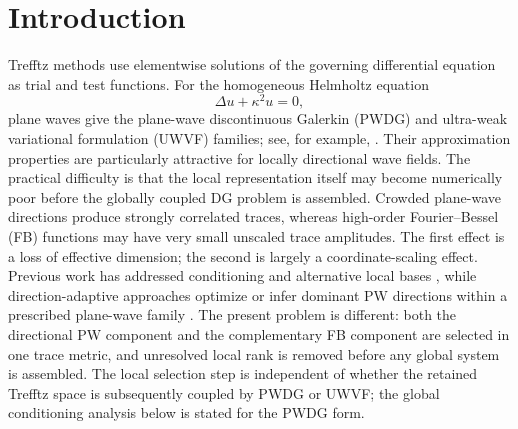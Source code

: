 \documentclass[11pt]{article}
\numberwithin{equation}{section}
\begin{document}
\section{Introduction}\label{sec:intro}
Trefftz methods use elementwise solutions of the governing differential equation as trial and test functions.  For the homogeneous Helmholtz equation
\begin{equation}\label{eq:helmholtz}
 \Delta u+\kappa^2u=0,
\end{equation}
plane waves give the plane-wave discontinuous Galerkin (PWDG) and ultra-weak variational formulation (UWVF) families; see, for example, \citep{CessenatDespres1998,GittelsonHiptmairPerugia2009,HiptmairMoiolaPerugia2011,HiptmairMoiolaPerugia2016}.  Their approximation properties are particularly attractive for locally directional wave fields.  The practical difficulty is that the local representation itself may become numerically poor before the globally coupled DG problem is assembled.  Crowded plane-wave directions produce strongly correlated traces, whereas high-order Fourier--Bessel (FB) functions may have very small unscaled trace amplitudes.  The first effect is a loss of effective dimension; the second is largely a coordinate-scaling effect.  Previous work has addressed conditioning and alternative local bases \citep{HuttunenMonkKaipio2002,PerreyDebain2006,LuostariHuttunenMonk2012,CongreveGedickePerugia2019,BarucqEtAl2021}, while direction-adaptive approaches optimize or infer dominant PW directions within a prescribed plane-wave family \citep{AmaraEtAl2014,AgrawalHoppe2017,FangEtAl2017,Kapita2026Directions}.  The present problem is different: both the directional PW component and the complementary FB component are selected in one trace metric, and unresolved local rank is removed before any global system is assembled.  The local selection step is independent of whether the retained Trefftz space is subsequently coupled by PWDG or UWVF; the global conditioning analysis below is stated for the PWDG form.
\end{document}
